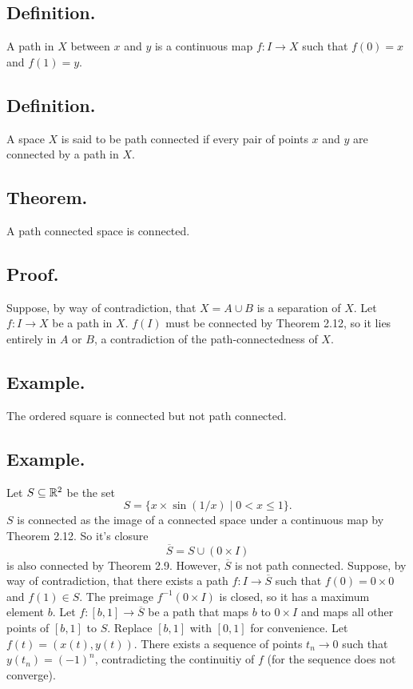 \documentclass[titlepage]{article}
\begin{document}
\subsection{Definition.} A path in $X$ between $x$ and $y$ is a continuous map $f: I \to X$ such that $f(0) = x$ and $f(1) = y$.

\subsection{Definition.} A space $X$ is said to be path connected if every pair of points $x$ and $y$ are connected by a path in $X$.

\subsection{Theorem.} A path connected space is connected.

\subsection{Proof.} Suppose, by way of contradiction, that $X = A \cup B$ is a separation of $X$. Let $f: I \to X$ be a path in $X$. $f(I)$ must be connected by Theorem 2.12, so it lies entirely in $A$ or $B$, a contradiction of the path-connectedness of $X$.

\subsection{Example.} The ordered square is connected but not path connected.

\subsection{Example.} Let $S \subseteq \mathbb{R}^{2}$ be the set 
$$S = \{x \times \sin(1/x) \mid 0 < x \leq 1\}.$$
$S$ is connected as the image of a connected space under a continuous map by Theorem 2.12. So it's closure 
$$\overline{S} = S \cup (0 \times I)$$
is also connected by Theorem 2.9. However, $\overline{S}$ is not path connected. Suppose, by way of contradiction, that there exists a path $f: I \to \overline{S}$ such that $f(0) = 0 \times 0$ and $f(1) \in S$. The preimage $f^{-1}(0 \times I)$ is closed, so it has a maximum element $b$. Let $f: [b, 1] \to \overline{S}$ be a path that maps $b$ to $0 \times I$ and maps all other points of $[b, 1]$ to $S$. Replace $[b, 1]$ with $[0, 1]$ for convenience. Let $f(t) = (x(t), y(t))$. There exists a sequence of points $t_{n} \to 0$ such that $y(t_{n}) = (-1)^{n}$, contradicting the continuitiy of $f$ (for the sequence does not converge).
\end{document}
